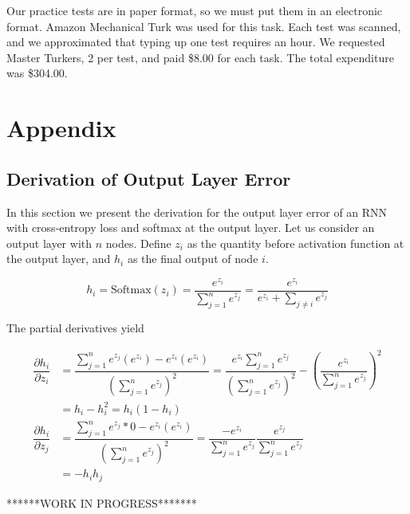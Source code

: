 \documentclass[pageno]{jpaper}
\begin{document}
Our practice tests are in paper format, so we must put them in an electronic
format. Amazon Mechanical Turk was used for this task. Each test was scanned,
and we approximated that typing up one test requires an hour. We requested
Master Turkers, 2 per test, and paid \$8.00 for each task. The total expenditure
was \$304.00.




\section{Appendix}
\label{Appendix}

\subsection{Derivation of Output Layer Error}
\label{Derivation of Output Layer Error}

In this section we present the derivation for the output layer error of an RNN
with cross-entropy loss and softmax at the output layer. Let us consider an
output layer with $n$ nodes. Define $z_i$ as the quantity before activation
function at the output layer, and $h_i$ as the final output of node $i$.

\begin{equation}
    \label{eq: output layer value}
    h_i = \text{Softmax}(z_i) = \dfrac{e^{z_i}}{\sum\limits_{j=1}^n e^{z_j}} = \dfrac{e^{z_i}}
    {e^{z_i} + \sum\limits_{j\neq i} e^{z_j}}
\end{equation}

The partial derivatives yield

\begin{equation}
    \label{eq: output partials}
    \begin{aligned}
        \dfrac{\partial h_i}{\partial z_i} &= \dfrac{\sum\limits_{j=1}^n e^{z_j}(e^{z_i}) - e^{z_i}(e^{z_i})}
        {\left( \sum\limits_{j=1}^n e^{z_j} \right)^2}
        = \dfrac{e^{z_i}\sum\limits_{j=1}^n e^{z_j}}{\left( \sum\limits_{j=1}^n e^{z_j} \right)^2}
        - \left( \dfrac{e^{z_i}}{ \sum\limits_{j=1}^n e^{z_j} } \right)^2 \\
        &= h_i - h_i^2
        = h_i\left( 1 - h_i \right) \\
        \dfrac{\partial h_i}{\partial z_j} &= \dfrac{\sum\limits_{j=1}^n e^{z_j}*0 - e^{z_i}(e^{z_i})}
        {\left( \sum\limits_{j=1}^n e^{z_j} \right)^2}
        = \dfrac{-e^{z_i}}{\sum\limits_{j=1}^n e^{z_j}}\dfrac{e^{z_j}}{\sum\limits_{j=1}^n e^{z_j}} \\
        &= -h_ih_j
    \end{aligned}
\end{equation}

******WORK IN PROGRESS*******

\end{document}
